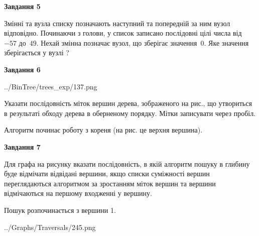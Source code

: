 \documentclass[12pt, ukrainian]{article}
\begin{document}
{\begin {large}
{\begin {center}\textbf{Завдання 5}\end {center}}\par
Змінні  та  вузла списку позначають наступний та попередній за ним вузол відповідно. Починаючи з голови, у список записано послідовні цілі числа від~$-57$ до~$49$. Нехай змінна  позначає вузол, що зберігає значення~$0$.
Яке значення зберігається у вузлі  ?\par
\newpage

{\begin {center}\textbf{Завдання 6}\end {center}}\par

\begin{center}
	{../BinTree/trees_exp/137.png}
\end{center}
Указати послідовність міток вершин дерева, зображеного на рис., що утвориться в результаті обходу дерева в оберненому порядку. Мітки записувати через пробіл.\par Алгоритм починає роботу з кореня (на рис. це верхня вершина).\par
\newpage

{\begin {center}\textbf{Завдання 7}\end {center}}\par
Для графа на рисунку вказати послідовність, в якій алгоритм пошуку в глибину буде відмічати відвідані вершини, якщо списки суміжності вершин переглядаються алгоритмом за зростанням міток вершин та вершини відмічаються на першому вход\-женні у вершину.\par
Пошук розпочинається з вершини 1.\par

\begin{center}
	{../Graphs/Traversals/245.png}
\end{center}\par
\newpage


\end{large}}
\end{document}
